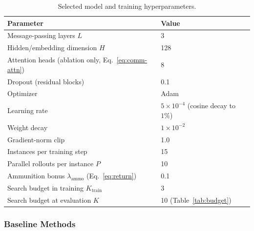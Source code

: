 \begin{table}[h]
\centering
\small
\caption{Selected model and training hyperparameters.}
\label{tab:hyperparameters}
\begin{tabular}{ll}
\hline
\textbf{Parameter} & \textbf{Value} \\ \hline
Message-passing layers $L$ & 3 \\
Hidden/embedding dimension $H$ & 128 \\
Attention heads (ablation only, Eq.~\eqref{eq:comm-attn}) & 8 \\
Dropout (residual blocks) & 0.1 \\
Optimizer & Adam \\
Learning rate & $5 \times 10^{-4}$ (cosine decay to $1\%$) \\
Weight decay & $1 \times 10^{-2}$ \\
Gradient-norm clip & 1.0 \\
Instances per training step & 15 \\
Parallel rollouts per instance $P$ & 10 \\
Ammunition bonus $\lambda_{\text{ammo}}$ (Eq.~\eqref{eq:return}) & 0.1 \\
Search budget in training $K_{\text{train}}$ & 3 \\
Search budget at evaluation $K$ & 10 (Table~\ref{tab:budget}) \\ \hline
\end{tabular}
\end{table}



\subsubsection{Baseline Methods}

